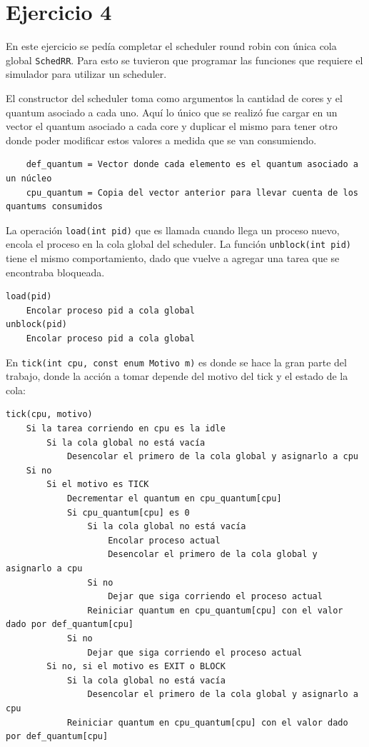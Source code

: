 \section{Ejercicio 4}

En este ejercicio se pedía completar el scheduler round robin con única cola
global \texttt{SchedRR}. Para esto se tuvieron que programar las funciones que
requiere el simulador para utilizar un scheduler.

El constructor del scheduler toma como argumentos la cantidad de cores y el
quantum asociado a cada uno. Aquí lo único que se realizó fue cargar en un
vector el quantum asociado a cada core y duplicar el mismo para tener otro
donde poder modificar estos valores a medida que se van consumiendo.

\begin{codesnippet}
\begin{verbatim}
    def_quantum = Vector donde cada elemento es el quantum asociado a un núcleo
    cpu_quantum = Copia del vector anterior para llevar cuenta de los quantums consumidos
\end{verbatim}
\end{codesnippet}

La operación \texttt{load(int pid)} que es llamada cuando llega un proceso
nuevo, encola el proceso en la cola global del scheduler. La función
\texttt{unblock(int pid)} tiene el mismo comportamiento, dado que vuelve a
agregar una tarea que se encontraba bloqueada.

\begin{codesnippet}
\begin{verbatim}
load(pid)
    Encolar proceso pid a cola global
unblock(pid)
    Encolar proceso pid a cola global
\end{verbatim}
\end{codesnippet}

En \texttt{tick(int cpu, const enum Motivo m)} es donde se hace la gran parte
del trabajo, donde la acción a tomar depende del motivo del tick y el estado de
la cola:

\begin{codesnippet}
\begin{verbatim}
tick(cpu, motivo)
    Si la tarea corriendo en cpu es la idle
        Si la cola global no está vacía
            Desencolar el primero de la cola global y asignarlo a cpu
    Si no
        Si el motivo es TICK
            Decrementar el quantum en cpu_quantum[cpu]
            Si cpu_quantum[cpu] es 0
                Si la cola global no está vacía
                    Encolar proceso actual
                    Desencolar el primero de la cola global y asignarlo a cpu
                Si no
                    Dejar que siga corriendo el proceso actual
                Reiniciar quantum en cpu_quantum[cpu] con el valor dado por def_quantum[cpu]
            Si no
                Dejar que siga corriendo el proceso actual
        Si no, si el motivo es EXIT o BLOCK
            Si la cola global no está vacía
                Desencolar el primero de la cola global y asignarlo a cpu
            Reiniciar quantum en cpu_quantum[cpu] con el valor dado por def_quantum[cpu]
\end{verbatim}
\end{codesnippet}

